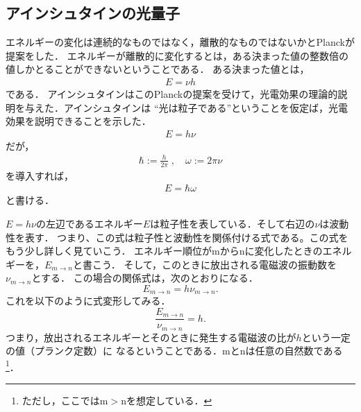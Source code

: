         \subsection{アインシュタインの光量子}
            エネルギーの変化は連続的なものではなく，離散的なものではないかとPlanckが提案をした．
            エネルギーが離散的に変化するとは，ある決まった値の整数倍の値しかとることができないということである．
            ある決まった値とは，
                \begin{align}
                    E=\nu h
                \end{align}
            である．
            アインシュタインはこのPlanckの提案を受けて，光電効果の理論的説明を与えた．アインシュタインは
            “光は粒子である”ということを仮定ば，光電効果を説明できることを示した．
                \begin{align}
                    E=h\nu
                \end{align}
            だが，
                \begin{align*}
                    \hbar := \frac{h}{2\pi}\;,\quad\omega:= 2\pi\nu
                \end{align*}
            を導入すれば，
                \begin{align}
                    E=\hbar\omega
                \end{align}
            と書ける．

                $E=h\nu$の左辺であるエネルギー$E$は粒子性を表している．そして右辺の$\nu$は波動性を表す．
                つまり、この式は粒子性と波動性を関係付ける式である。この式をもう少し詳しく見ていこう．
                エネルギー順位がmからnに変化したときのエネルギーを，${E}_{m \rightarrow n}$と書こう．
                そして，このときに放出される電磁波の振動数を${\nu}_{m \rightarrow n}$とする．
                この場合の関係式は，次のとおりになる．
                \[
                    {E}_{m \rightarrow n}=h{\nu}_{m \rightarrow n}.
                \]
                これを以下のように式変形してみる．
                \[
                    \frac{{E}_{m \rightarrow n}}{{\nu}_{m \rightarrow n}} = h.
                \]
                つまり，放出されるエネルギーとそのときに発生する電磁波の比が$h$という一定の値（プランク定数）に
                なるということである．mとnは任意の自然数である
                    \footnote{
                        ただし，ここではm$>$nを想定している．
                    }．
                
